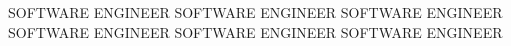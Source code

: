 \begin{cvparagraph}
  \center
  SOFTWARE ENGINEER SOFTWARE ENGINEER SOFTWARE ENGINEER SOFTWARE ENGINEER SOFTWARE ENGINEER SOFTWARE ENGINEER
\end{cvparagraph}


